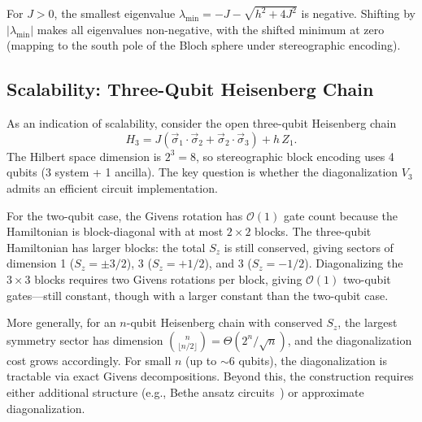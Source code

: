 \begin{remark}
	\label{rem:positivity-heisenberg}
	For $J > 0$, the smallest eigenvalue
	$\lambda_{\min} = -J - \sqrt{h^2+4J^2}$ is negative.
	Shifting by $|\lambda_{\min}|$ makes all eigenvalues
	non-negative, with the shifted minimum at zero (mapping
	to the south pole of the Bloch sphere under stereographic
	encoding).
\end{remark}

\subsection{Scalability: Three-Qubit Heisenberg Chain}
\label{subsec:three-qubit}

As an indication of scalability, consider the open three-qubit
Heisenberg chain
\begin{equation}
	H_3 = J(\vec{\sigma}_1 \cdot \vec{\sigma}_2
	+ \vec{\sigma}_2 \cdot \vec{\sigma}_3)
	+ h\, Z_1.
	\label{eq:heisenberg-3}
\end{equation}
The Hilbert space dimension is $2^3 = 8$, so stereographic
block encoding uses 4 qubits (3 system + 1 ancilla).  The
key question is whether the diagonalization $V_3$ admits an
efficient circuit implementation.

For the two-qubit case, the Givens rotation has
$\mathcal{O}(1)$ gate count because the Hamiltonian is
block-diagonal with at most $2\times 2$ blocks.
The three-qubit Hamiltonian has larger blocks: the total
$S_z$ is still conserved, giving sectors of dimension 1
($S_z = \pm 3/2$), 3 ($S_z = +1/2$), and 3 ($S_z = -1/2$).
Diagonalizing the $3\times 3$ blocks requires two Givens
rotations per block, giving $\mathcal{O}(1)$ two-qubit
gates---still constant, though with a larger constant than
the two-qubit case.

More generally, for an $n$-qubit Heisenberg chain with
conserved $S_z$, the largest symmetry sector has dimension
$\binom{n}{\lfloor n/2 \rfloor} = \Theta(2^n/\sqrt{n})$,
and the diagonalization cost grows accordingly.  For small
$n$ (up to $\sim\!6$ qubits), the diagonalization is
tractable via exact Givens decompositions.  Beyond this,
the construction requires either additional structure
(e.g., Bethe ansatz circuits~\cite{Bethe1931}) or
approximate diagonalization.
